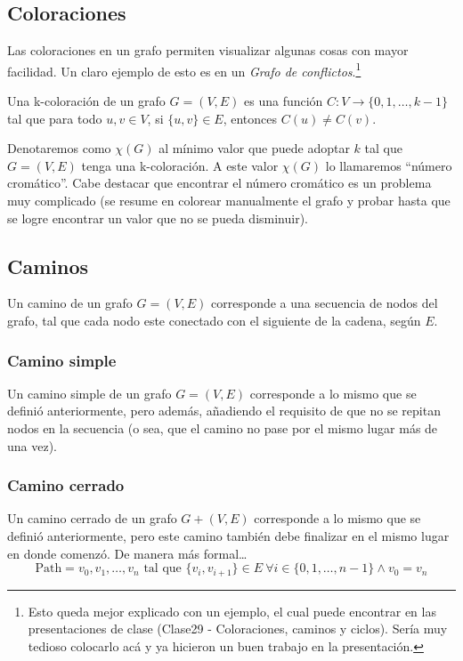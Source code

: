 \documentclass[../main.tex]{subfiles}
\begin{document}
\subsection{Coloraciones}
Las coloraciones en un grafo permiten visualizar algunas cosas con mayor facilidad. Un claro ejemplo de esto es en un \textit{Grafo de conflictos}.\footnote{Esto queda mejor explicado con un ejemplo, el cual puede encontrar en las presentaciones de clase (Clase29 - Coloraciones, caminos y ciclos). Sería muy tedioso colocarlo acá y ya hicieron un buen trabajo en la presentación.}

Una k-coloración de un grafo $G = (V,E)$ es una función $C: V \rightarrow \{0, 1, \ldots, k-1\}$ tal que para todo $u,v \in V$, si $\{u,v\} \in E$, entonces $C(u) \not= C(v)$.

Denotaremos como $\chi(G)$ al mínimo valor que puede adoptar $k$ tal que $G = (V,E)$ tenga una k-coloración. A este valor $\chi(G)$ lo llamaremos ``número cromático''. Cabe destacar que encontrar el número cromático es un problema muy complicado (se resume en colorear manualmente el grafo y probar hasta que se logre encontrar un valor que no se pueda disminuir).

\subsection{Caminos}
Un camino de un grafo $G = (V,E)$ corresponde a una secuencia de nodos del grafo, tal que cada nodo este conectado con el siguiente de la cadena, según $E$.

\subsubsection{Camino simple}
Un camino simple de un grafo $G = (V,E)$ corresponde a lo mismo que se definió anteriormente, pero además, añadiendo el requisito de que no se repitan nodos en la secuencia (o sea, que el camino no pase por el mismo lugar más de una vez).

\subsubsection{Camino cerrado}
Un camino cerrado de un grafo $G + (V,E)$ corresponde a lo mismo que se definió anteriormente, pero este camino también debe finalizar en el mismo lugar en donde comenzó. De manera más formal\dots
\[ \text{Path} = v_0, v_1, \ldots, v_n \text{ tal que } \{ v_i, v_{i+1} \} \in E\ \forall i \in \{0, 1, \ldots, n-1\} \wedge v_0 = v_n \]
\end{document}
